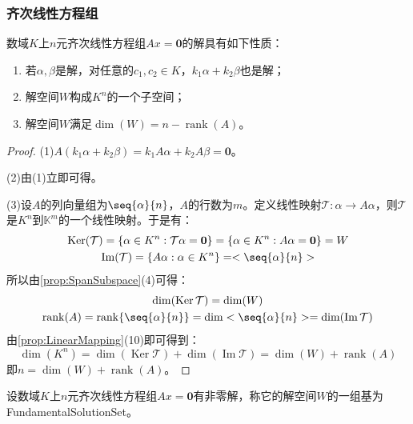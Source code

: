 \subsubsection{齐次线性方程组}
\begin{property}\label{prop:HomogeneousSLESolution}
	数域$K$上$n$元齐次线性方程组$Ax=\mathbf{0}$的解具有如下性质：
	\begin{enumerate}
		\item 若$\alpha,\beta$是解，对任意的$c_1,c_2\in K$，$k_1\alpha+k_2\beta$也是解；
		\item 解空间$W$构成$K^n$的一个子空间；
		\item 解空间$W$满足$\dim(W)=n-\operatorname{rank}(A)$。
	\end{enumerate}
\end{property}
\begin{proof}
	(1)$A(k_1\alpha+k_2\beta)=k_1A\alpha+k_2A\beta=\mathbf{0}$。\par
	(2)由(1)立即可得。\par
	(3)设$A$的列向量组为$\seq{\alpha}{n}$，$A$的行数为$m$。定义线性映射$\mathcal{T}:\alpha\longrightarrow A\alpha$，则$\mathcal{T}$是$K^n$到$\mathbb{K}^{m}$的一个线性映射。于是有：
	\begin{gather*}
		\operatorname{Ker}(\mathcal{T})=\{\alpha\in K^n:\mathcal{T}\alpha=\mathbf{0}\}=\{\alpha\in K^n:A\alpha=\mathbf{0}\}=W \\
		\operatorname{Im}(\mathcal{T})=\{A\alpha:\alpha\in K^n\}=<\seq{\alpha}{n}>
	\end{gather*}
	所以由\cref{prop:SpanSubspace}(4)可得：
	\begin{gather*}
		\dim(\operatorname{Ker}\mathcal{T})=\dim(W) \\
		\operatorname{rank}(A)=\operatorname{rank}\{\seq{\alpha}{n}\}=\dim<\seq{\alpha}{n}>=\dim(\operatorname{Im}\mathcal{T})
	\end{gather*}
	由\cref{prop:LinearMapping}(10)即可得到：
	\begin{equation*}
		\dim(K^n)=\dim(\operatorname{Ker}\mathcal{T})+\dim(\operatorname{Im}\mathcal{T})=\dim(W)+\operatorname{rank}(A)
	\end{equation*}
	即$n=\dim(W)+\operatorname{rank}(A)$。
\end{proof}
\begin{definition}
	设数域$K$上$n$元齐次线性方程组$Ax=\mathbf{0}$有非零解，称它的解空间$W$的一组基为\gls{FundamentalSolutionSet}。
\end{definition}

